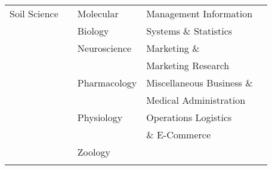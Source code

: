 \documentclass[11pt]{article}
\theoremstyle{definition}
\begin{document}
\begin{center}
\begin{tabular}{|l| l| l| l |l|}
 \hline
 Soil Science &  & Molecular & Management Information & \\
  &  & Biology & Systems \& Statistics & \\
  \hline \rowcolor{Gray}
  &  & Neuroscience & Marketing \& & \\
  \rowcolor{Gray}
  &  & & Marketing Research & \\
  \hline  &  & Pharmacology & Miscellaneous Business \& & \\
  &  & & Medical Administration & \\
\hline \rowcolor{Gray}
 &  & Physiology & Operations Logistics & \\
 \rowcolor{Gray}
 &  & & \& E-Commerce & \\
 \hline 
 &  & Zoology & & \\
 &  & & & \\
 \hline\hline
\end{tabular} 
\endgroup
\end{center}
\end{document}

